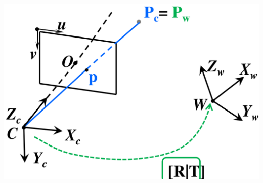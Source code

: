 \begin{minipage}[b]{0.49\linewidth}
    \includegraphics[width=\linewidth]{./Figures/04_PerspectiveProjection2.png}
\end{minipage}
